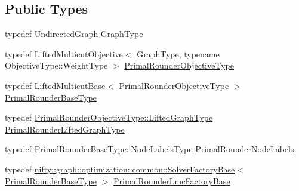 \subsection*{Public Types}
\begin{DoxyCompactItemize}
\item 
typedef \hyperlink{classnifty_1_1graph_1_1UndirectedGraph}{Undirected\+Graph} \hyperlink{structnifty_1_1graph_1_1optimization_1_1lifted__multicut_1_1LiftedMulticutMp_1_1LiftedRounder_a91c69552853fcb3f4b4016f364f5a391}{Graph\+Type}
\item 
typedef \hyperlink{classnifty_1_1graph_1_1optimization_1_1lifted__multicut_1_1LiftedMulticutObjective}{Lifted\+Multicut\+Objective}$<$ \hyperlink{structnifty_1_1graph_1_1optimization_1_1lifted__multicut_1_1LiftedMulticutMp_1_1LiftedRounder_a91c69552853fcb3f4b4016f364f5a391}{Graph\+Type}, typename Objective\+Type\+::\+Weight\+Type $>$ \hyperlink{structnifty_1_1graph_1_1optimization_1_1lifted__multicut_1_1LiftedMulticutMp_1_1LiftedRounder_a2676a2df5550e5055a8f7fb4e69905b6}{Primal\+Rounder\+Objective\+Type}
\item 
typedef \hyperlink{classnifty_1_1graph_1_1optimization_1_1lifted__multicut_1_1LiftedMulticutBase}{Lifted\+Multicut\+Base}$<$ \hyperlink{structnifty_1_1graph_1_1optimization_1_1lifted__multicut_1_1LiftedMulticutMp_1_1LiftedRounder_a2676a2df5550e5055a8f7fb4e69905b6}{Primal\+Rounder\+Objective\+Type} $>$ \hyperlink{structnifty_1_1graph_1_1optimization_1_1lifted__multicut_1_1LiftedMulticutMp_1_1LiftedRounder_a7f92b00ba49fda7c3b29a374246b9624}{Primal\+Rounder\+Base\+Type}
\item 
typedef \hyperlink{classnifty_1_1graph_1_1optimization_1_1lifted__multicut_1_1LiftedMulticutObjective_ad1dc4e746ffabb0ad64821f7259e2d75}{Primal\+Rounder\+Objective\+Type\+::\+Lifted\+Graph\+Type} \hyperlink{structnifty_1_1graph_1_1optimization_1_1lifted__multicut_1_1LiftedMulticutMp_1_1LiftedRounder_a50c015dc6966b849a329b52feec65d06}{Primal\+Rounder\+Lifted\+Graph\+Type}
\item 
typedef \hyperlink{classnifty_1_1graph_1_1optimization_1_1common_1_1SolverBase_a6e4e465f3b6e039882669fcfb9714818}{Primal\+Rounder\+Base\+Type\+::\+Node\+Labels\+Type} \hyperlink{structnifty_1_1graph_1_1optimization_1_1lifted__multicut_1_1LiftedMulticutMp_1_1LiftedRounder_afafd9d2bbeba494f83aa354ac9b2cfe1}{Primal\+Rounder\+Node\+Labels}
\item 
typedef \hyperlink{classnifty_1_1graph_1_1optimization_1_1common_1_1SolverFactoryBase}{nifty\+::graph\+::optimization\+::common\+::\+Solver\+Factory\+Base}$<$ \hyperlink{structnifty_1_1graph_1_1optimization_1_1lifted__multicut_1_1LiftedMulticutMp_1_1LiftedRounder_a7f92b00ba49fda7c3b29a374246b9624}{Primal\+Rounder\+Base\+Type} $>$ \hyperlink{structnifty_1_1graph_1_1optimization_1_1lifted__multicut_1_1LiftedMulticutMp_1_1LiftedRounder_a2a73fd52a53cab7edd1d8f516f02a5ae}{Primal\+Rounder\+Lmc\+Factory\+Base}
\end{DoxyCompactItemize}

